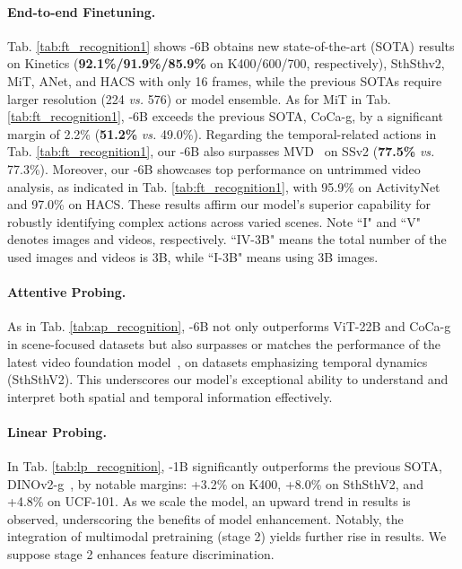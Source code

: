 

\paragraph{End-to-end Finetuning.}
Tab. \ref{tab:ft_recognition1} shows \modelname-6B obtains new state-of-the-art (SOTA) results on Kinetics (\textbf{92.1\%/91.9\%/85.9\%} on K400/600/700, respectively), SthSthv2, MiT, ANet, and HACS with only 16 frames, while the previous SOTAs require larger resolution (224 \textit{vs.} 576) or model ensemble. As for MiT in Tab. \ref{tab:ft_recognition1},
\modelname-6B exceeds the previous SOTA, CoCa-g, by a significant margin of 2.2\% (\textbf{51.2\%} \textit{vs.} 49.0\%). 
Regarding the temporal-related actions in Tab. \ref{tab:ft_recognition1},
our \modelname-6B also surpasses MVD~\cite{wang2023masked} on SSv2 (\textbf{77.5\%} \textit{vs.} 77.3\%). 
Moreover, our \modelname-6B showcases top performance on untrimmed video analysis, as indicated in Tab. \ref{tab:ft_recognition1}, 
with 95.9\% on ActivityNet and 97.0\% on HACS.
These results affirm our model's superior capability for robustly identifying complex actions across varied scenes. Note ``I" and ``V" denotes images and videos, respectively. ``IV-3B" means the total number of the used images and videos is 3B, while ``I-3B" means using 3B images.




\paragraph{Attentive Probing.}
As in Tab. \ref{tab:ap_recognition}, \modelname-6B not only outperforms ViT-22B \cite{Dehghani2023ScalingVT} and CoCa-g \cite{coca} in scene-focused datasets but also surpasses or matches the performance of the latest video foundation model~\cite{bardes2024vjepa,videoprism}, on datasets emphasizing temporal dynamics (SthSthV2). 
This underscores our model's exceptional ability to understand and interpret both spatial and temporal information effectively.



\paragraph{Linear Probing.}
In Tab. \ref{tab:lp_recognition}, \modelname-1B significantly outperforms the previous SOTA, DINOv2-g~\cite{oquab2023dinov2}, by notable margins: +3.2\% on K400, +8.0\% on SthSthV2, and +4.8\% on UCF-101. As we scale the model, an upward trend in results is observed, underscoring the benefits of model enhancement. Notably, the integration of multimodal pretraining (stage 2) yields further rise in results. We suppose stage 2 enhances feature discrimination.

